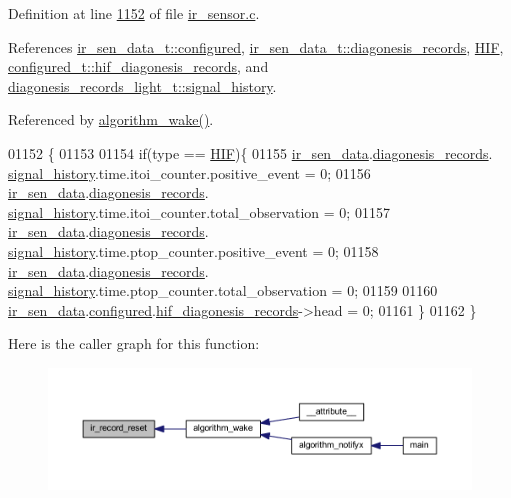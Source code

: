 Definition at line \hyperlink{a00045_source_l01152}{1152} of file \hyperlink{a00045_source}{ir\+\_\+sensor.\+c}.



References \hyperlink{a00023_source_l00040}{ir\+\_\+sen\+\_\+data\+\_\+t\+::configured}, \hyperlink{a00023_source_l00053}{ir\+\_\+sen\+\_\+data\+\_\+t\+::diagonesis\+\_\+records}, \hyperlink{a00017_source_l00022}{H\+I\+F}, \hyperlink{a00021_source_l00206}{configured\+\_\+t\+::hif\+\_\+diagonesis\+\_\+records}, and \hyperlink{a00017_affb63906d23cb1cb7787d61eaaedfb60}{diagonesis\+\_\+records\+\_\+light\+\_\+t\+::signal\+\_\+history}.



Referenced by \hyperlink{a00038_source_l00670}{algorithm\+\_\+wake()}.


\begin{DoxyCode}
01152                                 \{
01153 
01154     \textcolor{keywordflow}{if}(type == \hyperlink{a00017_aaa1c1ffe30eff38b979b1af9d4e4ef19}{HIF})\{
01155             \hyperlink{a00045_a73dfacb46242746440accc76c7ef710d}{ir\_sen\_data}.\hyperlink{a00023_a7ae905b560513ad201e58c2f63375030}{diagonesis\_records}.
      \hyperlink{a00017_affb63906d23cb1cb7787d61eaaedfb60}{signal\_history}.time.itoi\_counter.positive\_event      = 0;
01156             \hyperlink{a00045_a73dfacb46242746440accc76c7ef710d}{ir\_sen\_data}.\hyperlink{a00023_a7ae905b560513ad201e58c2f63375030}{diagonesis\_records}.
      \hyperlink{a00017_affb63906d23cb1cb7787d61eaaedfb60}{signal\_history}.time.itoi\_counter.total\_observation   = 0;
01157             \hyperlink{a00045_a73dfacb46242746440accc76c7ef710d}{ir\_sen\_data}.\hyperlink{a00023_a7ae905b560513ad201e58c2f63375030}{diagonesis\_records}.
      \hyperlink{a00017_affb63906d23cb1cb7787d61eaaedfb60}{signal\_history}.time.ptop\_counter.positive\_event      = 0;
01158             \hyperlink{a00045_a73dfacb46242746440accc76c7ef710d}{ir\_sen\_data}.\hyperlink{a00023_a7ae905b560513ad201e58c2f63375030}{diagonesis\_records}.
      \hyperlink{a00017_affb63906d23cb1cb7787d61eaaedfb60}{signal\_history}.time.ptop\_counter.total\_observation   = 0;
01159 
01160             \hyperlink{a00045_a73dfacb46242746440accc76c7ef710d}{ir\_sen\_data}.\hyperlink{a00023_a94b2d1f6ea4ab334c74d24984dd27843}{configured}.\hyperlink{a00021_ae18294f7499d9fcb5ec796a1816b8cd8}{hif\_diagonesis\_records}->head 
      = 0;
01161        \}
01162 \}
\end{DoxyCode}


Here is the caller graph for this function\+:\nopagebreak
\begin{figure}[H]
\begin{center}
\leavevmode
\includegraphics[width=350pt]{d6/d97/a00045_a1c9872e93491d95a24ab0bc723d39a74_icgraph}
\end{center}
\end{figure}


